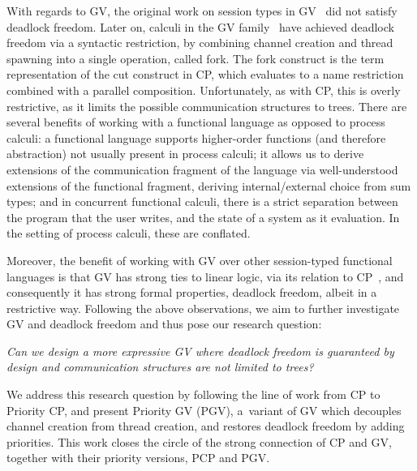 \documentclass[main.tex]{subfiles}
\begin{document}
With regards to GV, the original work on session types in GV~\cite{gayvasconcelos10,gayvasconcelos12} did not satisfy deadlock freedom. Later on, calculi in the GV family~\cite{wadler15,lindleymorris15} have achieved deadlock freedom via a syntactic restriction, \ie by combining channel creation and thread spawning into a single operation, called fork. The fork construct is the term representation of the cut construct in CP, which evaluates to a name restriction combined with a parallel composition. Unfortunately, as with CP, this is overly restrictive, as it limits the possible communication structures to trees. There are several benefits of working with a functional language as opposed to process calculi: a functional language supports higher-order functions (and therefore abstraction) not usually present in process calculi; it allows us to derive extensions of the communication fragment of the language via well-understood extensions of the functional fragment, \ie deriving internal/external choice from sum types; and in concurrent functional calculi, there is a strict separation between the program that the user writes, and the state of a system as it evaluation. In the setting of process calculi, these are conflated.

Moreover, the benefit of working with GV over other session-typed functional languages is that GV has strong ties to linear logic, via its relation to CP~\cite{wadler12}, and consequently it has strong formal properties, \eg deadlock freedom, albeit in a restrictive way.
Following the above observations, we aim to further investigate GV and deadlock freedom and thus pose our research question:

\emph{Can we design a more expressive GV where deadlock freedom is guaranteed by design and communication structures are not limited to trees?}

We address this research question by following the line of work from CP to Priority CP, and present
Priority GV (PGV), a~variant of GV which decouples channel creation from thread creation, and restores deadlock freedom by adding priorities. This work closes the circle of the strong connection of CP and GV, together with their priority versions, PCP and PGV.
\end{document}
